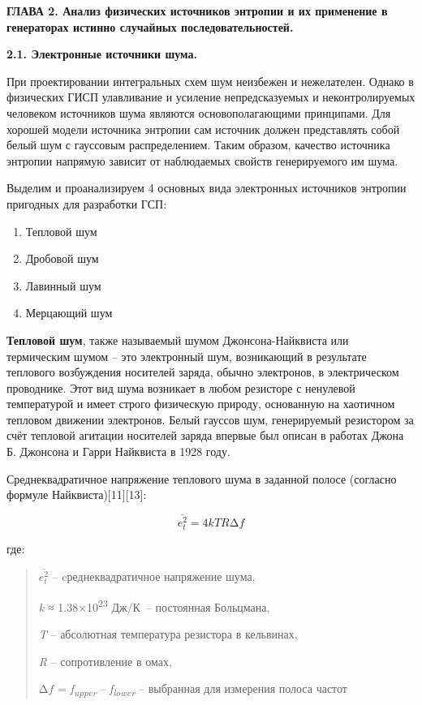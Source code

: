 \clearpage
\textbf{ГЛАВА 2. Анализ физических источников энтропии и их применение в
генераторах истинно случайных последовательностей.}

\textbf{2.1. Электронные источники шума.}

При проектировании интегральных схем шум неизбежен и нежелателен. Однако
в физических ГИСП улавливание и усиление непредсказуемых и
неконтролируемых человеком источников шума являются основополагающими
принципами. Для хорошей модели источника энтропии сам источник должен
представлять собой белый шум с гауссовым распределением. Таким образом,
качество источника энтропии напрямую зависит от наблюдаемых свойств
генерируемого им шума.

Выделим и проанализируем 4 основных вида электронных источников энтропии
пригодных для разработки ГСП:

\begin{enumerate}
\def\labelenumi{\arabic{enumi}.}
\item
  Тепловой шум
\item
  Дробовой шум
\item
  Лавинный шум
\item
  Мерцающий шум
\end{enumerate}

\textbf{Тепловой шум}, также называемый шумом Джонсона-Найквиста или
термическим шумом -- это электронный шум, возникающий в результате
теплового возбуждения носителей заряда, обычно электронов, в
электрическом проводнике. Этот вид шума возникает в любом резисторе с
ненулевой температурой и имеет строго физическую природу, основанную на
хаотичном тепловом движении электронов. Белый гауссов шум, генерируемый
резистором за счёт тепловой агитации носителей заряда впервые был описан
в работах Джона Б. Джонсона и Гарри Найквиста в 1928 году.

Среднеквадратичное напряжение теплового шума в заданной полосе (согласно
формуле Найквиста){[}11{]}{[}13{]}:

\[\overline{e_{t}^{2}} = 4kTR\mathrm{\Delta}f\]

где:

\begin{quote}
\(\overline{e_{t}^{2}}\) -- cреднеквадратичное напряжение шума,

\emph{k} ≈ 1.38×10\textsuperscript{23} Дж/К~-- постоянная Больцмана,

\emph{T} -- абсолютная температура резистора в кельвинах,

\emph{R} -- сопротивление в омах,

\(\mathrm{\Delta}f\) = \emph{f\textsubscript{upper}} --
\emph{f\textsubscript{lower }}-- выбранная для измерения полоса частот
\end{quote}

